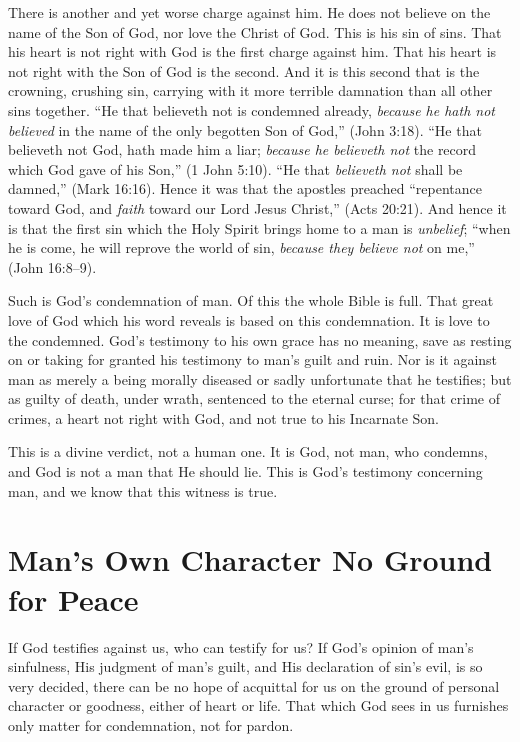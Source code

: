 \documentclass[
]{book}
\begin{document}
There is another and yet worse charge against him. He does not believe on the name of the Son of God, nor love the Christ of God. This is his sin of sins. That his heart is not right with God is the first charge against him. That his heart is not right with the Son of God is the second. And it is this second that is the crowning, crushing sin, carrying with it more terrible damnation than all other sins together. ``He that believeth not is condemned already, \emph{because he hath not believed} in the name of the only begotten Son of God,'' (John 3:18). ``He that believeth not God, hath made him a liar; \emph{because he believeth not} the record which God gave of his Son,'' (1 John 5:10). ``He that \emph{believeth not} shall be damned,'' (Mark 16:16). Hence it was that the apostles preached ``repentance toward God, and \emph{faith} toward our Lord Jesus Christ,'' (Acts 20:21). And hence it is that the first sin which the Holy Spirit brings home to a man is \emph{unbelief}; ``when he is come, he will reprove the world of sin, \emph{because they believe not} on me,'' (John 16:8--9).

Such is God's condemnation of man. Of this the whole Bible is full. That great love of God which his word reveals is based on this condemnation. It is love to the condemned. God's testimony to his own grace has no meaning, save as resting on or taking for granted his testimony to man's guilt and ruin. Nor is it against man as merely a being morally diseased or sadly unfortunate that he testifies; but as guilty of death, under wrath, sentenced to the eternal curse; for that crime of crimes, a heart not right with God, and not true to his Incarnate Son.

This is a divine verdict, not a human one. It is God, not man, who condemns, and God is not a man that He should lie. This is God's testimony concerning man, and we know that this witness is true.

\hypertarget{mans-own-character-no-ground-for-peace}{%
\chapter{Man's Own Character No Ground for Peace}\label{mans-own-character-no-ground-for-peace}}

If God testifies against us, who can testify for us? If God's opinion of man's sinfulness, His judgment of man's guilt, and His declaration of sin's evil, is so very decided, there can be no hope of acquittal for us on the ground of personal character or goodness, either of heart or life. That which God sees in us furnishes only matter for condemnation, not for pardon.
\end{document}

